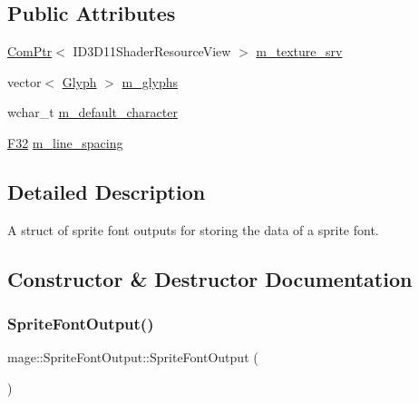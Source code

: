 \subsection*{Public Attributes}
\begin{DoxyCompactItemize}
\item 
\hyperlink{namespacemage_ae74f374780900893caa5555d1031fd79}{Com\+Ptr}$<$ I\+D3\+D11\+Shader\+Resource\+View $>$ \hyperlink{structmage_1_1_sprite_font_output_abece35d0abdacf81538969a3ec8a5617}{m\+\_\+texture\+\_\+srv}
\item 
vector$<$ \hyperlink{structmage_1_1_glyph}{Glyph} $>$ \hyperlink{structmage_1_1_sprite_font_output_aee63c847a919bce662dee371594607dd}{m\+\_\+glyphs}
\item 
wchar\+\_\+t \hyperlink{structmage_1_1_sprite_font_output_a137cca7a8a91c623272b345e9931ca80}{m\+\_\+default\+\_\+character}
\item 
\hyperlink{namespacemage_aa97e833b45f06d60a0a9c4fc22ae02c0}{F32} \hyperlink{structmage_1_1_sprite_font_output_afa189d48c92167f6a01f63a1616b7c95}{m\+\_\+line\+\_\+spacing}
\end{DoxyCompactItemize}


\subsection{Detailed Description}
A struct of sprite font outputs for storing the data of a sprite font. 

\subsection{Constructor \& Destructor Documentation}
\hypertarget{structmage_1_1_sprite_font_output_a91ed0cd4cb7f9bfab57ff0e3fa4436bc}{}\label{structmage_1_1_sprite_font_output_a91ed0cd4cb7f9bfab57ff0e3fa4436bc} 
\subsubsection{\texorpdfstring{Sprite\+Font\+Output()}{SpriteFontOutput()}\hspace{0.1cm}{\footnotesize\ttfamily [1/3]}}
{\footnotesize\ttfamily mage\+::\+Sprite\+Font\+Output\+::\+Sprite\+Font\+Output (\begin{DoxyParamCaption}{ }\end{DoxyParamCaption})\hspace{0.3cm}{\ttfamily [default]}}

